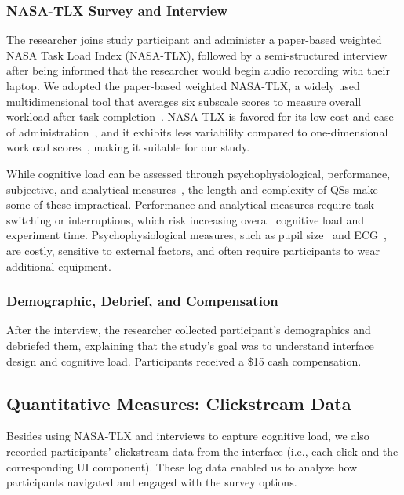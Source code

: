 \subsubsection{NASA-TLX Survey and Interview}
The researcher joins study participant and administer a paper-based weighted NASA Task Load Index (NASA-TLX), followed by a semi-structured interview after being informed that the researcher would begin audio recording with their laptop. We adopted the paper-based weighted NASA-TLX, a widely used multidimensional tool that averages six subscale scores to measure overall workload after task completion~\cite{hart1988development, hartNasaTaskLoadIndex2006, cain2007review}. NASA-TLX is favored for its low cost and ease of administration~\cite{gaoMentalWorkloadMeasurement2013}, and it exhibits less variability compared to one-dimensional workload scores~\cite{rubioEvaluationSubjectiveMental2004}, making it suitable for our study. 

While cognitive load can be assessed through psychophysiological, performance, subjective, and analytical measures~\cite{gaoMentalWorkloadMeasurement2013}, the length and complexity of QSs make some of these impractical. Performance and analytical measures require task switching or interruptions, which risk increasing overall cognitive load and experiment time. Psychophysiological measures, such as pupil size~\cite{palinkoEstimatingCognitiveLoad2010} and ECG~\cite{haapalainenPsychophysiologicalMeasuresAssessing2010}, are costly, sensitive to external factors, and often require participants to wear additional equipment.

\subsubsection{Demographic, Debrief, and Compensation}
After the interview, the researcher collected participant's demographics and debriefed them, explaining that the study's goal was to understand interface design and cognitive load. Participants received a \$15 cash compensation.

\newpage

\subsection{Quantitative Measures: Clickstream Data}
\label{subsec:measures}

Besides using NASA-TLX and interviews to capture cognitive load, we also recorded participants' clickstream data from the interface (i.e., each click and the corresponding UI component). These log data enabled us to analyze how participants navigated and engaged with the survey options.

